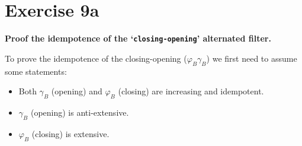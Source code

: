 \section*{Exercise 9a}

{
\bfseries
Proof the idempotence of the `\texttt{closing-opening}' alternated filter.
}

To prove the idempotence of the closing-opening ($\varphi_B\gamma_B$) we first need to assume some statements:
\begin{itemize}
    \item Both $\gamma_B$ (opening) and $\varphi_B$ (closing) are increasing and idempotent.
    \item $\gamma_B$ (opening) is anti-extensive.
    \item $\varphi_B$ (closing) is extensive.
\end{itemize}

\newtheorem{thm}{Theorem}

\phantom{a}

